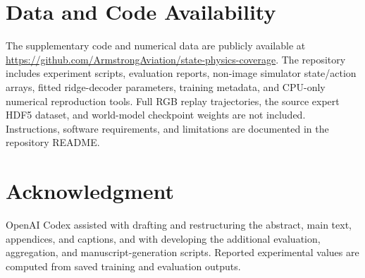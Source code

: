 \section*{Data and Code Availability}
The supplementary code and numerical data are publicly available at \url{https://github.com/ArmstrongAviation/state-physics-coverage}. The repository includes experiment scripts, evaluation reports, non-image simulator state/action arrays, fitted ridge-decoder parameters, training metadata, and CPU-only numerical reproduction tools. Full RGB replay trajectories, the source expert HDF5 dataset, and world-model checkpoint weights are not included. Instructions, software requirements, and limitations are documented in the repository README.

\section*{Acknowledgment}
OpenAI Codex \cite{openai2026codex} assisted with drafting and restructuring the abstract, main text, appendices, and captions, and with developing the additional evaluation, aggregation, and manuscript-generation scripts. Reported experimental values are computed from saved training and evaluation outputs.

\FloatBarrier


\raggedbottom

\EOD

